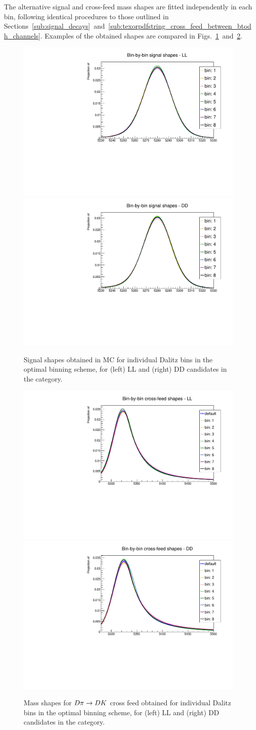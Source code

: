 The alternative signal and cross-feed mass shapes are fitted independently in each bin, following identical procedures to those outlined in Sections~\ref{sub:signal_decays}~and~\ref{sub:texorpdfstring_cross_feed_between_btodh_channels}. Examples of the obtained shapes are compared in Figs.~\ref{fig:signal_bin_by_bin}~and~\ref{fig:misID_bin_by_bin}.

\begin{figure}[tp]
    \centering
    \includegraphics[width=0.45\columnwidth]{figures/analysis/systematics/bin_by_bin_signal_LL.pdf}
    \includegraphics[width=0.45\columnwidth]{figures/analysis/systematics/bin_by_bin_signal_DD.pdf}
    \caption{Signal shapes obtained in MC for individual Dalitz bins in the optimal binning scheme, for (left) LL and (right) DD candidates in the \BtoDpiDtoKspipi category. }
    \label{fig:signal_bin_by_bin}
\end{figure}

\begin{figure}[tp]
    \centering
    \includegraphics[width=0.45\columnwidth]{figures/analysis/systematics/bin_by_bin_misID_LL.pdf}
    \includegraphics[width=0.45\columnwidth]{figures/analysis/systematics/bin_by_bin_misID_DD.pdf}
    \caption{Mass shapes for ${D}\pi \rightarrow{\ensuremath{D}}{\ensuremath{K}}$ cross feed obtained for individual Dalitz bins in the optimal binning scheme, for (left) LL and (right) DD candidates in the \DtoKspipi category.}
    \label{fig:misID_bin_by_bin}
\end{figure}

